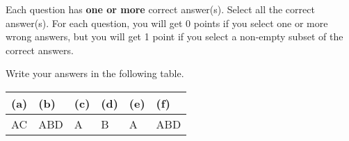 
Each question has \textbf{one or more} correct answer(s). Select all the correct answer(s). For each question, you will get 0 points if you select one or more wrong answers, but you will get 1 point if you select a non-empty subset of the correct answers.

Write your answers in the following table.


\begin{table}[htbp]
    \centering
    \begin{tabular}{|p{2cm}|p{2cm}|p{2cm}|p{2cm}|p{2cm}|p{2cm}|}
        \hline
        (a) & (b) & (c) & (d) & (e) & (f) \\
        \hline
        AC  & ABD & A   & B   & A   & ABD \\
        \hline
    \end{tabular}\label{tab:multiple}
\end{table}

